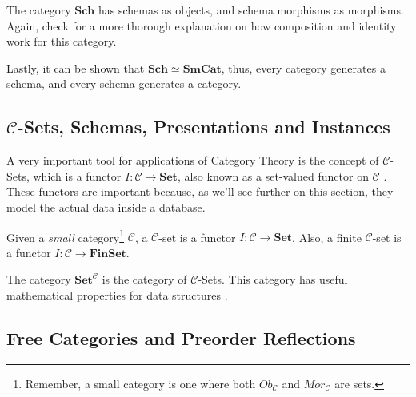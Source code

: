 \begin{definition}
  The category $\mathbf{Sch}$ has schemas as objects, and schema morphisms as morphisms.
  Again, check \citet{spivak2014category} for a more thorough explanation on how composition
  and identity work for this category.
\end{definition}

Lastly, it can be shown that $\mathbf{Sch} \simeq \mathbf{SmCat}$, thus,
every category generates a schema, and every schema generates a category.


\subsection{$\mathcal C$-Sets, Schemas, Presentations and Instances}

A very important tool for applications of Category Theory is the
concept of $\mathcal C$-Sets, which is a functor $I:\mathcal C \to \mathbf{Set}$,
also known as a set-valued functor on $\mathcal C$ \citep{fong2019invitation}.
These functors are important because, as we'll see further on this section,
they model the actual data inside a database.


\begin{definition}
  Given a \textit{small} category\footnote{Remember, a small category is one where both
  $Ob_\mathcal C$ and $Mor_\mathcal C$ are sets.} $\mathcal C$, a $\mathcal C$-set
  is a functor $I:\mathcal C \to \mathbf{Set}$. Also, a finite $\mathcal C$-set
  is a functor $I:\mathcal C \to \mathbf{FinSet}$.
\end{definition}

The category $\mathbf{Set}^{\mathcal C}$ is the category of $\mathcal C$-Sets. This category
has useful mathematical properties for data structures \citep{patterson2021categorical}.


\subsection{Free Categories and Preorder Reflections}
